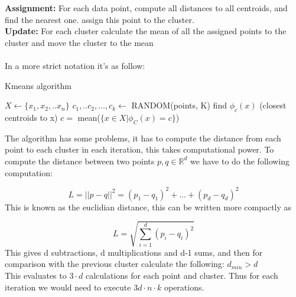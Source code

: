 \documentclass[12pt]{report}
\begin{document}
\textbf{Assignment:} For each data point, compute all distances to all centroids, and find the nearest one. assign this point to the cluster.\\
\textbf{Update:} For each cluster calculate the mean of all the assigned points to the cluster and move the cluster to the mean\\ \\

In a more strict notation it's as follow:

\begin{algorithm}[h!]
  \caption{Kmeans algorithm}
  \begin{algorithmic}

    \State $\textit{X} \gets \{x_1, x_2, .. x_n\}$
    \State $c_1, ..c_2,...,c_k \gets$ RANDOM(points, K)
    find $\phi_c(x)$ (closest centroids to x)
    \EndFor
    $c =$ mean($\{x \in X | \phi_C(x) = c\}$)
    \EndFor
    \EndWhile
    \EndProcedure
  \end{algorithmic}

\end{algorithm}

The algorithm has some problems, it has to compute the distance from each point to each cluster in each iteration, this takes computational power. To compute the distance between two points $p,q \in \mathbb{R}^d$ we have to do the following computation:

\begin{equation}
  L = ||p - q||^2 = (p_1 - q_1)^2 +...+(p_d - q_d)^2
\end{equation}
This is known as the euclidian distance, this can be written more compactly as

\begin{equation}
  L = \sqrt{\sum_{i=1}^d(p_i - q_i)^2}
\end{equation}
This gives d subtractions, d multiplications and d-1 sums, and then for comparison with the previous cluster calculate the following: $d_{min} > d$ \\
This evaluates to $3\cdot d$ calculations for each point and cluster. Thus for each iteration we would need to execute $3d \cdot n \cdot k$ operations.
\end{document}
